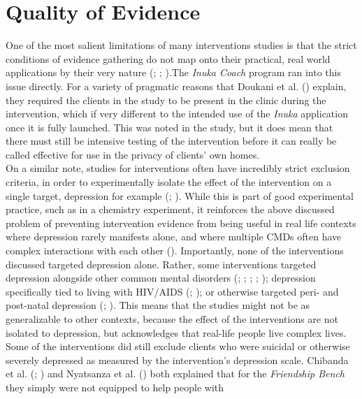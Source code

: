 \documentclass[stu,a4paper,12pt,donotrepeattitle]{apa7}
\begin{document}
\section{Quality of Evidence}
One of the most salient limitations of many interventions studies
is that the strict conditions of evidence gathering do not map onto their
practical, real world applications by their very nature (\cite{douketal21};
\cite{kaz14}; \cite{shed18}).The \textit{Inuka Coach} program ran into this
issue directly. For a variety of pragmatic reasons that Doukani et al.
(\citeyear{douketal21}) explain, they required the clients in the study to be
present in the clinic during the intervention, which if very different to the
intended use of the \textit{Inuka} application once it is fully launched.
This was noted in the study, but it does mean that there must still be
intensive testing of the intervention before it can really be called effective
for use in the privacy of clients' own homes.\\
On a similar note, studies for interventions often have incredibly strict
exclusion criteria, in order to experimentally isolate the effect of the
intervention on a single target, depression for example (\cite{kaz14};
\cite{shed18}). While this is part of good experimental practice, such as in
a chemistry experiment, it reinforces the above discussed problem of preventing
intervention evidence from being useful in real life contexts where depression
rarely manifests alone, and where multiple CMDs often have complex interactions
with each other (\cite{shed18}). Importantly, none of the interventions discussed
targeted depression alone. Rather, some interventions targeted depression
alongside other common mental disorders (\cite{abasal16}; \cite{chibandaetal11};
\cite{chibandaetal15}; \cite{chibandaetal16}; \cite{douketal21}); depression
specifically tied to living with HIV/AIDS (\cite{logetal18};
\cite{petersenetal14}); or otherwise targeted peri- and post-natal depression
(\cite{lunetal14}; \cite{nyatetal16}). This means that the studies might not be
as generalizable to other contexts, because the effect of the interventions are
not isolated to depression, but acknowledges that real-life people live complex
lives. \\
Some of the interventions did still exclude clients who were suicidal or
otherwise severely depressed as measured by the intervention's depression scale.
Chibanda et al. (\citeyear{chibandaetal11}; \cite{chibandaetal15}) and
Nyatsanza et al. (\citeyear{nyatetal16}) both explained that for the
\textit{Friendship Bench} they simply were not equipped to help people with
\end{document}
